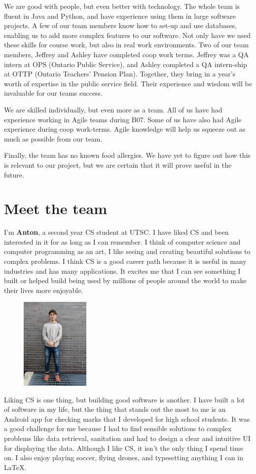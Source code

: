 \documentclass[12pt]{scrreprt}
\begin{document}
We are good with people, but even better with technology. The whole team is fluent in Java and Python, and have experience using them in large software projects. A few of our team members know how to set-up and use databases, enabling us to add more complex features to our software. Not only have we used these skills for course work, but also in real work environments. Two of our team members, Jeffrey and Ashley have completed coop work terms. Jeffrey was a QA intern at OPS (Ontario Public Service), and Ashley completed a QA intern-ship at OTTP (Ontario Teachers' Pension Plan). Together, they bring in a year's worth of expertise in the public service field. Their experience and wisdom will be invaluable for our teams success. 

We are skilled individually, but even more as a team. All of us have had experience working in Agile teams during B07. Some of us have also had Agile experience during coop work-terms. Agile knowledge will help us squeeze out as much as possible from our team.

Finally, the team has no known food allergies. We have yet to figure out how this is relevant to our project, but we are certain that it will prove useful in the future.

\section{Meet the team}

I'm \textbf{Anton}, a second year CS student at UTSC. I have liked CS and been interested in it for as long as I can remember. I think of computer science and computer programming as an art, I like seeing and creating beautiful solutions to complex problems. I think CS is a good career path because it is useful in many industries and has many applications. It excites me that I can see something I built or helped build being used by millions of people around the world to make their lives more enjoyable.
\begin{figure} 
	\includegraphics[angle=-90,origin=c,width=0.3\textwidth]{anton}
\end{figure} Liking CS is one thing, but building good software is another. I have built a lot of software in my life, but the thing that stands out the most to me is an Android app for checking marks that I developed for high school students. It was a good challenge for me because I had to find sensible solutions to complex problems like data retrieval, sanitation and had to design a clear and intuitive UI for displaying the data. Although I like CS, it isn't the only thing I spend time on. I also enjoy playing soccer, flying drones, and typesetting anything I can in \LaTeX.
\end{document}
